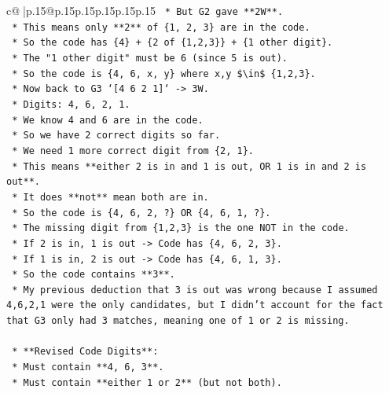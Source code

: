 \documentclass{article}
\begin{document}
{\begin{supertabular}{c@{$\;$}|p{.15\linewidth}@{}p{.15\linewidth}p{.15\linewidth}p{.15\linewidth}p{.15\linewidth}p{.15\linewidth}}
{{{\texttt{                    *   But G2 gave **2W**.} \\
\texttt{                    *   This means only **2** of \{1, 2, 3\} are in the code.} \\
\texttt{                    *   So the code has \{4\} + \{2 of \{1,2,3\}\} + \{1 other digit\}.} \\
\texttt{                    *   The "1 other digit" must be 6 (since 5 is out).} \\
\texttt{                    *   So the code is \{4, 6, x, y\} where x,y \$\textbackslash{}in\$ \{1,2,3\}.} \\
\texttt{                *   Now back to G3 `{[}4 6 2 1{]}` {-}> 3W.} \\
\texttt{                    *   Digits: 4, 6, 2, 1.} \\
\texttt{                    *   We know 4 and 6 are in the code.} \\
\texttt{                    *   So we have 2 correct digits so far.} \\
\texttt{                    *   We need 1 more correct digit from \{2, 1\}.} \\
\texttt{                    *   This means **either 2 is in and 1 is out, OR 1 is in and 2 is out**.} \\
\texttt{                    *   It does **not** mean both are in.} \\
\texttt{                    *   So the code is \{4, 6, 2, ?\} OR \{4, 6, 1, ?\}.} \\
\texttt{                    *   The missing digit from \{1,2,3\} is the one NOT in the code.} \\
\texttt{                    *   If 2 is in, 1 is out {-}> Code has \{4, 6, 2, 3\}.} \\
\texttt{                    *   If 1 is in, 2 is out {-}> Code has \{4, 6, 1, 3\}.} \\
\texttt{                    *   So the code contains **3**.} \\
\texttt{                    *   My previous deduction that 3 is out was wrong because I assumed 4,6,2,1 were the only candidates, but I didn't account for the fact that G3 only had 3 matches, meaning one of 1 or 2 is missing.} \\
\\ 
\texttt{    *   **Revised Code Digits**:} \\
\texttt{        *   Must contain **4, 6, 3**.} \\
\texttt{        *   Must contain **either 1 or 2** (but not both).} \\
}}}
\end{supertabular}}
\end{document}
